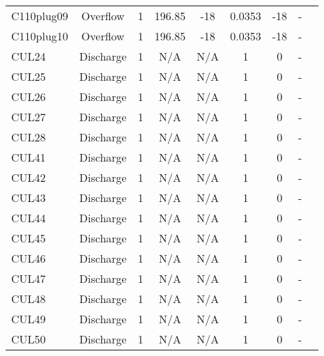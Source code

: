 \begin{table}[h]
\begin{tabular}{@{}lcccccccc@{}}
{C110plug09}    & Overflow      & 1        & 196.85      & -18          & 0.0353      & -18             & -            \\
{C110plug10}    & Overflow      & 1        & 196.85      & -18          & 0.0353      & -18             & -            \\
{CUL24}         & Discharge     & 1        & N/A         & N/A          & 1           & 0               & -            \\
{CUL25}         & Discharge     & 1        & N/A         & N/A          & 1           & 0               & -            \\
{CUL26}         & Discharge     & 1        & N/A         & N/A          & 1           & 0               & -            \\
{CUL27}         & Discharge     & 1        & N/A         & N/A          & 1           & 0               & -            \\
{CUL28}         & Discharge     & 1        & N/A         & N/A          & 1           & 0               & -            \\
{CUL41}         & Discharge     & 1        & N/A         & N/A          & 1           & 0               & -            \\
{CUL42}         & Discharge     & 1        & N/A         & N/A          & 1           & 0               & -            \\
{CUL43}         & Discharge     & 1        & N/A         & N/A          & 1           & 0               & -            \\
{CUL44}         & Discharge     & 1        & N/A         & N/A          & 1           & 0               & -            \\
{CUL45}         & Discharge     & 1        & N/A         & N/A          & 1           & 0               & -            \\
{CUL46}         & Discharge     & 1        & N/A         & N/A          & 1           & 0               & -            \\
{CUL47}         & Discharge     & 1        & N/A         & N/A          & 1           & 0               & -            \\
{CUL48}         & Discharge     & 1        & N/A         & N/A          & 1           & 0               & -            \\
{CUL49}         & Discharge     & 1        & N/A         & N/A          & 1           & 0               & -            \\
{CUL50}         & Discharge     & 1        & N/A         & N/A          & 1           & 0               & -            \\

\end{tabular}
\end{table}
